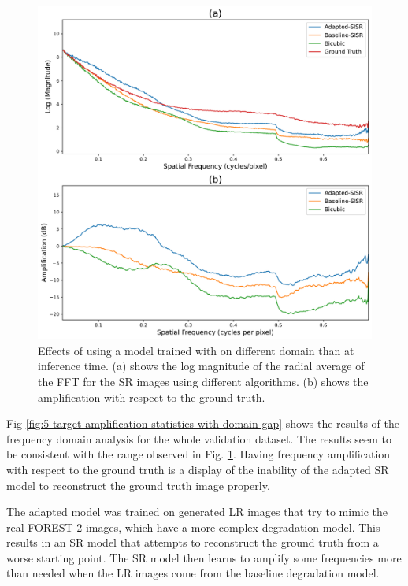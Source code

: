         \begin{figure}[H]
            \centering
            \includegraphics[scale=0.4]{Includes/5-target-prediction-with-domain-gap-fft.pdf}
            \caption{Effects of using a model trained with on different domain than at inference time. (a) shows the log magnitude of the radial average of the FFT for the SR images using different algorithms. (b) shows the amplification with respect to the ground truth.}
            \label{fig:5-target-prediction-with-domain-gap-fft}
        \end{figure}

        Fig \ref{fig:5-target-amplification-statistics-with-domain-gap} shows the results of the frequency domain analysis for the whole validation dataset. The results seem to be consistent with the range observed in Fig. \ref{fig:5-target-prediction-with-domain-gap-fft}. Having frequency amplification with respect to the ground truth is a display of the inability of the adapted SR model to reconstruct the ground truth image properly.
        
        The adapted model was trained on generated LR images that try to mimic the real FOREST-2 images, which have a more complex degradation model. This results in an SR model that attempts to reconstruct the ground truth from a worse starting point. The SR model then learns to amplify some frequencies more than needed when the LR images come from the baseline degradation model.


